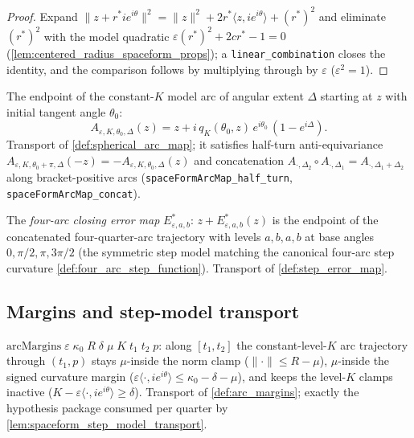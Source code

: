 \begin{proof}
  \leanok
  Expand $\|z+r^\ast ie^{i\theta}\|^2=\|z\|^2+2r^\ast\langle z,
  ie^{i\theta}\rangle+(r^\ast)^2$ and eliminate $(r^\ast)^2$ with the model
  quadratic $\varepsilon(r^\ast)^2+2cr^\ast-1=0$
  (\cref{lem:centered_radius_spaceform_props}); a
  \texttt{linear\_combination} closes the identity, and the comparison
  follows by multiplying through by $\varepsilon$ ($\varepsilon^2=1$).
\end{proof}

\begin{definition}
  \label{def:spaceform_arc_map}
  The endpoint of the constant-$K$ model arc of angular extent $\Delta$
  starting at $z$ with initial tangent angle $\theta_0$:
  \[
    A_{\varepsilon,K,\theta_0,\Delta}(z)
    = z + i\,q_K(\theta_0,z)\,e^{i\theta_0}\,(1-e^{i\Delta}).
  \]
  Transport of \cref{def:spherical_arc_map}; it satisfies half-turn
  anti-equivariance
  $A_{\varepsilon,K,\theta_0+\pi,\Delta}(-z)=-A_{\varepsilon,K,\theta_0,\Delta}(z)$
  and concatenation
  $A_{\cdot,\Delta_2}\circ A_{\cdot,\Delta_1}=A_{\cdot,\Delta_1+\Delta_2}$
  along bracket-positive arcs
  (\texttt{spaceFormArcMap\_half\_turn}, \texttt{spaceFormArcMap\_concat}).
\end{definition}

\begin{definition}
  \label{def:spaceform_step_error_map}
  The \emph{four-arc closing error map} $E^\ast_{\varepsilon,a,b}$:
  $z+E^\ast_{\varepsilon,a,b}(z)$ is the endpoint of the concatenated
  four-quarter-arc trajectory with levels $a,b,a,b$ at base angles
  $0,\pi/2,\pi,3\pi/2$ (the symmetric step model matching the canonical
  four-arc step curvature \cref{def:four_arc_step_function}). Transport of
  \cref{def:step_error_map}.
\end{definition}

\subsection{Margins and step-model transport}

\begin{definition}
  \label{def:spaceform_arc_margins}
  $\mathrm{arcMargins}\;\varepsilon\;\kappa_0\;R\;\delta\;\mu\;K\;t_1\;t_2\;p$:
  along $[t_1,t_2]$ the constant-level-$K$ arc trajectory through $(t_1,p)$
  stays $\mu$-inside the norm clamp ($\|\cdot\|\le R-\mu$), $\mu$-inside the
  signed curvature margin
  ($\varepsilon\langle\cdot, ie^{i\theta}\rangle\le\kappa_0-\delta-\mu$), and
  keeps the level-$K$ clamps inactive
  ($K-\varepsilon\langle\cdot, ie^{i\theta}\rangle\ge\delta$). Transport of
  \cref{def:arc_margins}; exactly the hypothesis package consumed per
  quarter by \cref{lem:spaceform_step_model_transport}.
\end{definition}

